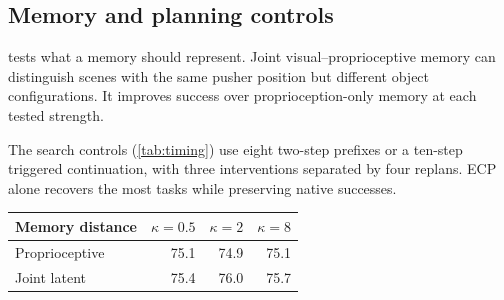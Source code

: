 \begin{table}[!t]
\begin{minipage}[t]{\columnwidth}
\subsection{Memory and planning controls}
 tests what a memory should represent. Joint visual--proprioceptive memory can distinguish scenes with the same pusher position but different object configurations. It improves success over proprioception-only memory at each tested strength.\par\smallskip
\normalsize
The search controls (\cref{tab:timing}) use eight two-step prefixes or a ten-step triggered continuation, with three interventions separated by four replans. ECP alone recovers the most tasks while preserving native successes.\par
\end{minipage}\hfill
\begin{minipage}[t]{\columnwidth}
\vspace{0pt}
\par\smallskip
{\centering
\centering
{}
\label{tab:memory-strength}
\small
\begin{tabular}{lrrr}
\toprule
Memory distance & $\kappa=0.5$ & $\kappa=2$ & $\kappa=8$\\
\midrule
Proprioceptive &75.1&74.9&75.1\\
Joint latent &75.4&76.0&75.7\\
\bottomrule
\end{tabular}
\par}
\end{minipage}\par
\par\smallskip
\noindent \begin{minipage}[t]{\columnwidth}
\vspace{0pt}

\end{minipage}
\end{table}
